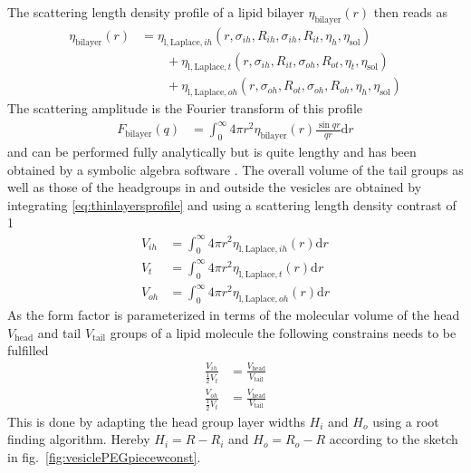 The scattering length density profile of a lipid bilayer $\eta_\mathrm{bilayer}(r)$ then reads as
\begin{align}\label{eq:eta_bilayer_smoothed}
  \eta_\mathrm{bilayer}(r) & =  \eta_{\mathrm{l,Laplace},ih}(r,\sigma_{ih},R_{ih},\sigma_{ih},R_{it},\eta_h,\eta_\mathrm{sol}) \nonumber \\
   & \qquad + \eta_{\mathrm{l,Laplace},t}(r,\sigma_{ih},R_{it},\sigma_{oh},R_{ot},\eta_t,\eta_\mathrm{sol}) \\
   & \qquad + \eta_{\mathrm{l,Laplace},oh}(r,\sigma_{oh},R_{ot},\sigma_{oh},R_{oh},\eta_h,\eta_\mathrm{sol}) \nonumber
\end{align}
The scattering amplitude is the Fourier transform of this profile
\begin{align}
  F_\mathrm{bilayer}(q) &=  \int_0^{\infty} 4\pi r^2  \eta_\mathrm{bilayer}(r) \frac{\sin qr}{qr}\mathrm{d}r
\end{align}
and can be performed fully analytically but is quite lengthy and has been obtained by a symbolic algebra software \cite{Mathematica_12_1}. The overall volume of the tail groups as well as those of the headgroups in and outside the vesicles are obtained by integrating \ref{eq:thinlayersprofile} and using a scattering length density contrast of 1
\begin{align}\label{eq:V_of_thinlayersprofile}
  V_{ih} &=  \int_0^{\infty} 4\pi r^2  \eta_{\mathrm{l,Laplace},ih}(r) \mathrm{d}r \\
  V_{t}  &=  \int_0^{\infty} 4\pi r^2  \eta_{\mathrm{l,Laplace},t}(r)  \mathrm{d}r \\
  V_{oh} &=  \int_0^{\infty} 4\pi r^2  \eta_{\mathrm{l,Laplace},oh}(r) \mathrm{d}r
\end{align}
As the form factor is parameterized in terms of the molecular volume of the head $V_\mathrm{head}$ and tail $V_\mathrm{tail}$ groups of a lipid molecule the following constrains needs to be fulfilled
\begin{align}
  \frac{V_{ih}}{\frac12 V_{t}} &= \frac{V_\mathrm{head}}{V_\mathrm{tail}} \\
  \frac{V_{oh}}{\frac12 V_{t}} &= \frac{V_\mathrm{head}}{V_\mathrm{tail}}
\end{align}
This is done by adapting the head group layer widths $H_{i}$ and $H_{o}$ using a root finding algorithm. Hereby $H_{i}= R-R_{i}$ and $H_{o}=R_{o}-R$ according to the sketch in fig.\ \ref{fig:vesiclePEGpiecewconst}.

